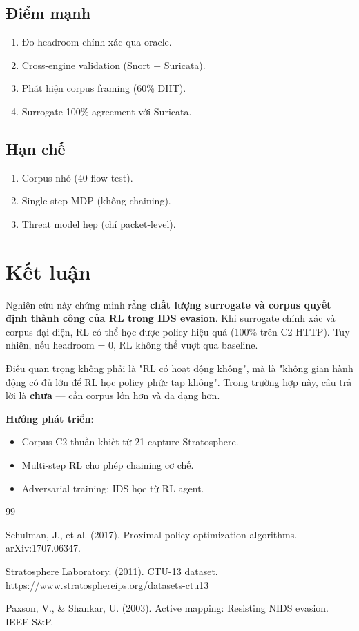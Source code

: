 \documentclass[12pt, a4paper, openany]{book}
\begin{document}
\section{Điểm mạnh}

\begin{enumerate}
    \item Đo headroom chính xác qua oracle.
    \item Cross-engine validation (Snort + Suricata).
    \item Phát hiện corpus framing (60\% DHT).
    \item Surrogate 100\% agreement với Suricata.
\end{enumerate}

\section{Hạn chế}

\begin{enumerate}
    \item Corpus nhỏ (40 flow test).
    \item Single-step MDP (không chaining).
    \item Threat model hẹp (chỉ packet-level).
\end{enumerate}

\chapter{Kết luận}

Nghiên cứu này chứng minh rằng \textbf{chất lượng surrogate và corpus quyết định thành công của RL trong IDS evasion}. Khi surrogate chính xác và corpus đại diện, RL có thể học được policy hiệu quả (100\% trên C2-HTTP). Tuy nhiên, nếu headroom = 0, RL không thể vượt qua baseline.

Điều quan trọng không phải là "RL có hoạt động không", mà là "không gian hành động có đủ lớn để RL học policy phức tạp không". Trong trường hợp này, câu trả lời là \textbf{chưa} — cần corpus lớn hơn và đa dạng hơn.

\textbf{Hướng phát triển}:
\begin{itemize}
    \item Corpus C2 thuần khiết từ 21 capture Stratosphere.
    \item Multi-step RL cho phép chaining cơ chế.
    \item Adversarial training: IDS học từ RL agent.
\end{itemize}

\begin{thebibliography}{99}

Schulman, J., et al. (2017). Proximal policy optimization algorithms. arXiv:1707.06347.

Stratosphere Laboratory. (2011). CTU-13 dataset. https://www.stratosphereips.org/datasets-ctu13

Paxson, V., \& Shankar, U. (2003). Active mapping: Resisting NIDS evasion. IEEE S\&P.

\end{thebibliography}
\end{document}
